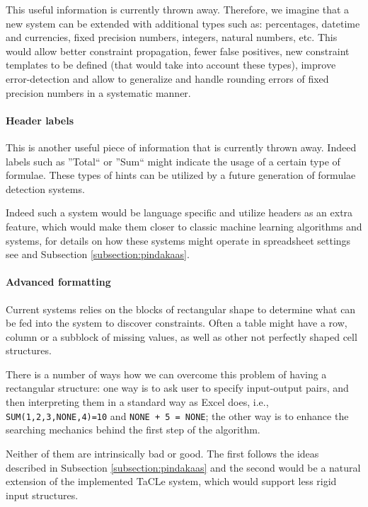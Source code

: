 This useful information is currently thrown away. Therefore, we imagine that a new system can be extended with additional types such as: percentages, datetime and currencies, fixed precision numbers, integers, natural numbers, etc. This would allow better constraint propagation, fewer false positives, new constraint templates to be defined (that would take into account these types), improve error-detection and allow to generalize and handle rounding errors of fixed precision numbers in a systematic manner.

\paragraph{Header labels}
This is another useful piece of information that is currently thrown away. Indeed labels such as ''Total`` or ''Sum`` might indicate the usage of a certain type of formulae. These types of hints can be utilized by a future generation of formulae detection systems.

Indeed such a system would be language specific and utilize headers as an extra feature, which would make them closer to classic machine learning algorithms and systems, for details on how these systems might operate in spreadsheet settings see \textcite{robustfill} and Subsection \ref{subsection:pindakaas}.

\paragraph{Advanced formatting} Current systems relies on the blocks of rectangular shape to determine what can be fed into the system to discover constraints. Often a table might have a row, column or a subblock of missing values, as well as other not perfectly shaped cell structures.

There is a number of ways how we can overcome this problem of having a rectangular structure: one way is to ask user to specify input-output pairs, and then interpreting them in a standard way as Excel does, i.e., \texttt{SUM(1,2,3,NONE,4)=10} and \texttt{NONE + 5 = NONE}; the other way is to enhance the searching mechanics behind the first step of the algorithm. 

Neither of them are intrinsically bad or good. The first follows the ideas described in Subsection \ref{subsection:pindakaas} and the second would be a natural extension of the implemented TaCLe system, which would support less rigid input structures. 
\pubrevend





